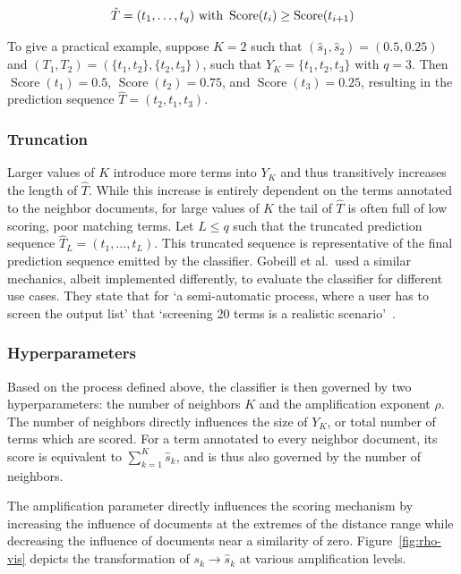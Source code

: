 \documentclass[11pt]{article}
\theoremstyle{plain}
\theoremstyle{definition}
\begin{document}
\begin{equation}\label{eq:pred-sequence}
    \hat{T} = (t_1, \dots, t_q) \textnormal{ with } \operatorname{Score}(t_i) \geq \operatorname{Score}(t_{i+1})
\end{equation}

To give a practical example, suppose $K=2$ such that $(\hat{s}_1, \hat{s}_2) = (0.5, 0.25)$ and $(T_1, T_2) = (\{t_1, t_2\},\{t_2, t_3\})$,  such that $Y_K = \{t_1, t_2, t_3\}$ with $q=3$. Then $\operatorname{Score}(t_1) = 0.5$, $\operatorname{Score}(t_2) = 0.75$, and $\operatorname{Score}(t_3) = 0.25$, resulting in the prediction sequence $\hat{T} = (t_2, t_1, t_3)$.

\subsubsection{Truncation}\label{sec:methods-scoring-truncation}

Larger values of $K$ introduce more terms into $Y_K$ and thus transitively increases the length of $\hat{T}$. While this increase is entirely dependent on the terms annotated to the neighbor documents, for large values of $K$ the tail of $\hat{T}$ is often full of low scoring, poor matching terms. Let $L \leq q$ such that the truncated prediction sequence $\hat{T}_L = (t_1, \dots, t_L)$. This truncated sequence is representative of the final prediction sequence emitted by the classifier. Gobeill et al.\ used a similar mechanics, albeit implemented differently, to evaluate the classifier for different use cases. They state that for `a semi-automatic process, where a user has to screen the output list' that `screening 20 terms is a realistic scenario'~\cite{gobeill/2013/managing}.

\subsubsection{Hyperparameters}\label{sec:methods-scoring-hyperparameters}

Based on the process defined above, the classifier is then governed by two hyperparameters: the number of neighbors $K$ and the amplification exponent $\rho$. The number of neighbors directly influences the size of $Y_K$, or total number of terms which are scored. For a term annotated to every neighbor document, its score is equivalent to $\sum_{k=1}^K \hat{s}_k$, and is thus also governed by the number of neighbors.

The amplification parameter directly influences the scoring mechanism by increasing the influence of documents at the extremes of the distance range while decreasing the influence of documents near a similarity of zero. Figure~\ref{fig:rho-vis} depicts the transformation of $s_k \rightarrow \hat{s}_k$ at various amplification levels.
\end{document}
